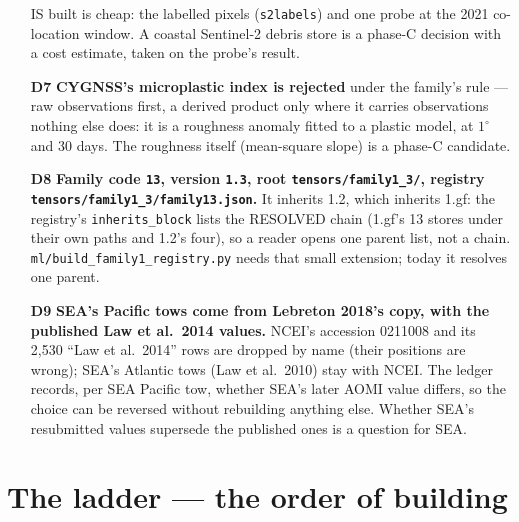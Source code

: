 \documentclass[10pt]{article}
\newcommand{\code}[1]{\texttt{#1}}
\begin{document}
\begin{enumerate}
IS built is cheap: the labelled pixels (\code{s2labels}) and one probe at the 2021 co-location window. A coastal
Sentinel-2 debris store is a phase-C decision with a cost estimate, taken on the probe's result.
\item[\textbf{D7}] \textbf{CYGNSS's microplastic index is rejected} under the family's rule --- raw observations
first, a derived product only where it carries observations nothing else does: it is a roughness anomaly fitted to
a plastic model, at $1^\circ$ and 30 days. The roughness itself (mean-square slope) is a phase-C candidate.
\item[\textbf{D8}] \textbf{Family code \code{13}, version \code{1.3}, root \code{tensors/\allowbreak family1\_3/}, registry
\code{tensors/\allowbreak family1\_3/\allowbreak family13.json}.} It inherits 1.2, which inherits 1.gf: the registry's
\code{inherits\_block} lists the RESOLVED chain (1.gf's 13 stores under their own paths and 1.2's four), so a reader
opens one parent list, not a chain. \code{ml/build\_family1\_registry.py} needs that small extension; today it
resolves one parent.
\item[\textbf{D9}] \textbf{SEA's Pacific tows come from Lebreton 2018's copy, with the published Law et al.\ 2014
values.} NCEI's accession 0211008 and its 2,530 ``Law et al.\ 2014'' rows are dropped by name (their positions are
wrong); SEA's Atlantic tows (Law et al.\ 2010) stay with NCEI. The ledger records, per SEA Pacific tow, whether SEA's
later AOMI value differs, so the choice can be reversed without rebuilding anything else. Whether SEA's resubmitted
values supersede the published ones is a question for SEA.
\end{enumerate}

\section{The ladder --- the order of building}
\label{sec:ladder}
\end{document}
